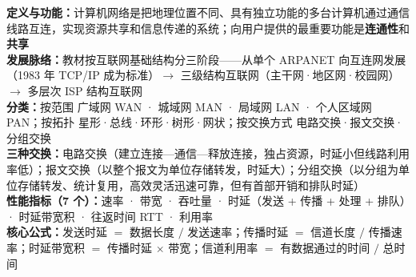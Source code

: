 \documentclass[a4paper,11pt]{article}
\begin{document}

\begin{knowmap}
\textbf{定义与功能：}计算机网络是把地理位置不同、具有独立功能的多台计算机通过通信线路互连，实现资源共享和信息传递的系统；向用户提供的最重要功能是\textbf{连通性}和\textbf{共享}\\[2pt]
\textbf{发展脉络：}教材按互联网基础结构分三阶段——从单个 ARPANET 向互连网发展（1983 年 TCP/IP 成为标准）$\rightarrow$ 三级结构互联网（主干网·地区网·校园网）$\rightarrow$ 多层次 ISP 结构互联网\\[2pt]
\textbf{分类：}按范围 广域网 WAN · 城域网 MAN · 局域网 LAN · 个人区域网 PAN；按拓扑 星形·总线·环形·树形·网状；按交换方式 电路交换·报文交换·分组交换\\[2pt]
\textbf{三种交换：}电路交换（建立连接—通信—释放连接，独占资源，时延小但线路利用率低）；报文交换（以整个报文为单位存储转发，时延大）；分组交换（以分组为单位存储转发、统计复用，高效灵活迅速可靠，但有首部开销和排队时延）\\[2pt]
\textbf{性能指标（7 个）：}速率 · 带宽 · 吞吐量 · 时延（发送 + 传播 + 处理 + 排队）· 时延带宽积 · 往返时间 RTT · 利用率\\[2pt]
\textbf{核心公式：}发送时延 $=$ 数据长度 $/$ 发送速率；传播时延 $=$ 信道长度 $/$ 传播速率；时延带宽积 $=$ 传播时延 $\times$ 带宽；信道利用率 $=$ 有数据通过的时间 $/$ 总时间
\end{knowmap}
\end{document}
